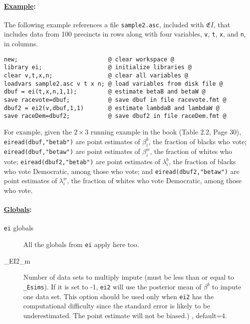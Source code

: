 \documentclass[11pt,titlepage]{article}
\newcommand{\EI}{\ensuremath{{\mathfrak EI}}}
\begin{document}
\paragraph{\underline{Example}:}
The following example references a file \texttt{sample2.asc}, included
with \EI, that includes data from 100 precincts in rows along with
four variables, \texttt{v}, \texttt{t}, \texttt{x}, and \texttt{n}, in
columns.
\begin{verbatim}
new;                          @ clear workspace @
library ei;                   @ initialize libraries @
clear v,t,x,n;                @ clear all variables @
loadvars sample2.asc v t x n; @ load variables from disk file @
dbuf = ei(t,x,n,1,1);         @ estimate betaB and betaW @
save racevote=dbuf;           @ save dbuf in file racevote.fmt @
dbuf2 = ei2(v,dbuf,1,1)       @ estimate lambdaB and lambdaW @
save raceDem=dbuf2;           @ save dbuf2 in file raceDem.fmt @
\end{verbatim}

For example, given the $2\times 3$ running example in the book (Table
2.2, Page 30), \texttt{eiread(dbuf,"betab")} are point estimates of
$\beta_i^b$, the fraction of blacks who vote;
\texttt{eiread(dbuf,"betaw")} are point estimates of $\beta_i^w$, the
fraction of whites who vote; \texttt{eiread(dbuf2,"betab")} are point
estimates of $\lambda_i^b$, the fraction of blacks who vote
Democratic, among those who vote; and \texttt{eiread(dbuf2,"betaw")}
are point estimates of $\lambda_i^w$, the fraction of whites who vote
Democratic, among those who vote.

\paragraph{\underline{Globals}:}
\begin{description}
\item[\texttt{ei} globals] All the globals from \texttt{ei} apply here
  too.

\item[\_EI2\_m] Number of data sets to multiply impute (must be less
than or equal to \texttt{\_Esims}). If it is set to -1, \texttt{ei2}
will use the posterior mean of $\beta^b$ to impute one data set. This
option should be used only when \texttt{ei2} has the computational
difficulty since the standard error is likely to be
underestimated. The point estimate will not be biased.) , default=4.

\end{description}
\end{document}
